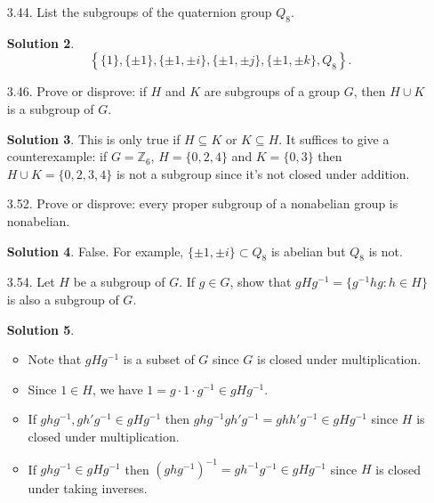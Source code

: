 \documentclass{article}
\newcommand{\RR}{\mathbb{R}}
\newcommand{\ZZ}{\mathbb{Z}}
\DeclareMathOperator{\SL}{SL}
\theoremstyle{definition}
\newtheorem*{solution}{Solution}
\begin{document}
\begin{enumerate}
\begin{solution}
\begin{itemize}
\begin{align*}
&= \begin{psmallmatrix} \cos(\theta)\cos(\varphi) - \sin(\theta)\sin(\varphi) & -\sin(\theta)\cos(\varphi) - \cos(\theta)\sin(\varphi) \\ \sin(\theta)\cos(\varphi) + \cos(\theta)\sin(\varphi) & \cos(\theta)\cos(\varphi) - \sin(\theta)\sin(\varphi) \end{psmallmatrix} \\
&= \begin{psmallmatrix} \cos(\theta + \varphi) & -\sin(\theta + \varphi) \\ \sin(\theta + \varphi) & \cos(\theta + \varphi) \end{psmallmatrix}.
\end{align*}
Thus $G$ is closed under taking products, and thus $G$ is a subgroup of $\SL_2(\RR)$. \qed
\end{itemize}
\end{solution}
\item[3.44.] List the subgroups of the quaternion group $Q_8$.
\begin{solution}
\[
\left\{\{1\},\{\pm 1\}, \{\pm 1, \pm i\}, \{\pm 1, \pm j\}, \{\pm 1, \pm k\}, Q_8\right\}.
\]
\end{solution}
\item[3.46.] Prove or disprove: if $H$ and $K$ are subgroups of a group $G$, then $H \cup K$ is a subgroup of $G$.
\begin{solution}
This is only true if $H \subseteq K$ or $K \subseteq H$.  It suffices to give a counterexample: if $G = \ZZ_6$, $H = \{0,2,4\}$ and $K=\{0,3\}$ then $H \cup K = \{0,2,3,4\}$ is not a subgroup since it's not closed under addition.
\end{solution}
\item[3.52.] Prove or disprove: every proper subgroup of a nonabelian group is nonabelian.
\begin{solution}
False.  For example, $\{\pm 1, \pm i\} \subset Q_8$ is abelian but $Q_8$ is not.
\end{solution}
\item[3.54.] Let $H$ be a subgroup of $G$.  If $g \in G$, show that $gHg^{-1} = \{g^{-1}hg : h \in H\}$ is also a subgroup of $G$.
\begin{solution} $ $
\begin{itemize}
\item Note that $gHg^{-1}$ is a subset of $G$ since $G$ is closed under multiplication.
\item Since $1 \in H$, we have $1 = g\cdot 1 \cdot g^{-1} \in gHg^{-1}$.
\item If $ghg^{-1}, gh'g^{-1} \in gHg^{-1}$ then $ghg^{-1}gh'g^{-1} = ghh'g^{-1} \in gHg^{-1}$ since $H$ is closed under multiplication.
\item If $ghg^{-1} \in gHg^{-1}$ then $(ghg^{-1})^{-1} = gh^{-1}g^{-1} \in gHg^{-1}$ since $H$ is closed under taking inverses.
\end{itemize}
\end{solution}
\end{enumerate}
\end{document}
